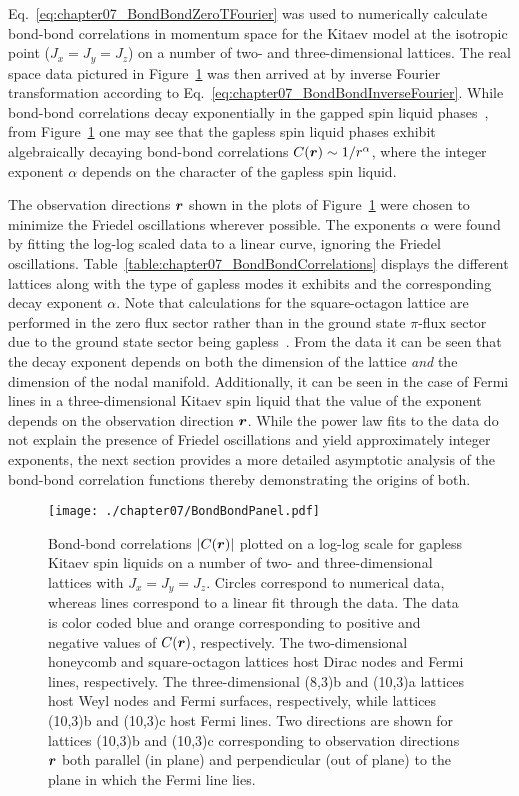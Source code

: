 Eq.~\eqref{eq:chapter07_BondBondZeroTFourier} was used to numerically calculate bond-bond correlations in momentum space for the Kitaev model at the isotropic point ($J_x = J_y = J_z$) on a number of two- and three-dimensional lattices.
The real space data pictured in Figure~\ref{fig:chapter07_6_3BondBondPanel} was then arrived at by inverse Fourier transformation according to Eq.~\eqref{eq:chapter07_BondBondInverseFourier}.
While bond-bond correlations decay exponentially in the gapped spin liquid phases~\cite{YangPRA2008}, from Figure~\ref{fig:chapter07_6_3BondBondPanel} one may see that the gapless spin liquid phases exhibit algebraically decaying bond-bond correlations $C(\bm{r}) \sim 1/r^{\alpha}$, where the integer exponent $\alpha$ depends on the character of the gapless spin liquid.

The observation directions $\bm{r}$ shown in the plots of Figure~\ref{fig:chapter07_6_3BondBondPanel} were chosen to minimize the Friedel oscillations wherever possible.
The exponents $\alpha$ were found by fitting the log-log scaled data to a linear curve, ignoring the Friedel oscillations.
Table~\ref{table:chapter07_BondBondCorrelations} displays the different lattices along with the type of gapless modes it exhibits and the corresponding decay exponent $\alpha$.
Note that calculations for the square-octagon lattice are performed in the zero flux sector rather than in the ground state $\pi$-flux sector due to the ground state sector being gapless~\cite{YangPRB2007}.
From the data it can be seen that the decay exponent depends on both the dimension of the lattice \textit{and} the dimension of the nodal manifold.
Additionally, it can be seen in the case of Fermi lines in a three-dimensional Kitaev spin liquid that the value of the exponent depends on the observation direction $\bm{r}$.
While the power law fits to the data do not explain the presence of Friedel oscillations and yield approximately integer exponents, the next section provides a more detailed asymptotic analysis of the bond-bond correlation functions thereby demonstrating the origins of both.
%
\begin{figure}[p]
	\centering
	\texttt{[image: ./chapter07/BondBondPanel.pdf]}
	\caption{
		Bond-bond correlations $\left| C(\bm{r}) \right|$ plotted on a log-log scale for gapless Kitaev spin liquids on a number of two- and three-dimensional lattices with $J_x = J_y = J_z$.
		Circles correspond to numerical data, whereas lines correspond to a linear fit through the data.
		The data is color coded blue and orange corresponding to positive and negative values of $C(\bm{r})$, respectively.
		The two-dimensional honeycomb and square-octagon lattices host Dirac nodes and Fermi lines, respectively.
		The three-dimensional (8,3)b and (10,3)a lattices host Weyl nodes and Fermi surfaces, respectively, while lattices (10,3)b and (10,3)c host Fermi lines.
		Two directions are shown for lattices (10,3)b and (10,3)c corresponding to observation directions $\bm{r}$ both parallel (in plane) and perpendicular (out of plane) to the plane in which the Fermi line lies.
	}
	\label{fig:chapter07_6_3BondBondPanel}
\end{figure}
%


